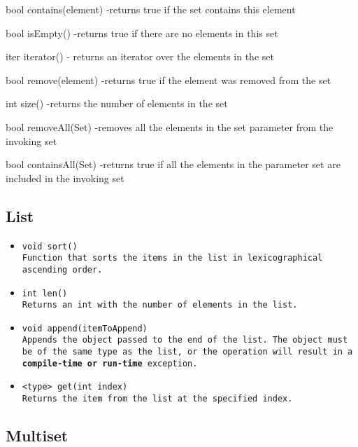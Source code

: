 \documentclass{book}
\begin{document}
bool contains(element)
-returns true if the set contains this element

bool isEmpty()
-returns true if there are no elements in this set

iter iterator()
- returns an iterator over the elements in the set

bool remove(element)
-returns true if the element was removed from the set

int size()
-returns the number of elements in the set

bool removeAll(Set) 
-removes all the elements in the set parameter from the invoking set

bool containsAll(Set) 
-returns true if all the elements in the parameter set are included in the invoking set

\subsection{List} %
\label{sub:list}

\begin{itemize}

\item \tt void sort() \rm \\

Function that sorts the items in the list in lexicographical ascending order.

\item \tt int len() \rm \\

Returns an int with the number of elements in the list.

\item \tt void append(itemToAppend) \rm \\

Appends the object passed to the end of the list. The object must be of the same
type as the list, or the operation will result in a \textbf{compile-time or
run-time} exception.

\item \tt <type> get(int index) \rm \\

Returns the item from the list at the specified index.

\end{itemize}



\subsection{Multiset} %
\label{sub:multiset}
\end{document}
